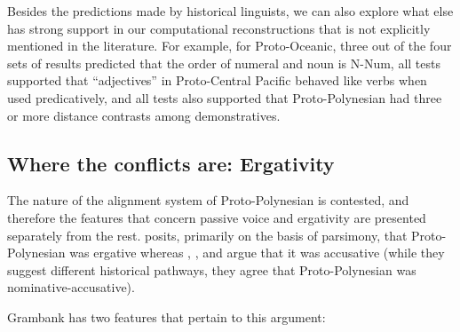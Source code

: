 \documentclass[a4paper,10pt]{article} %
\begin{document}
%
%

Besides the predictions made by historical linguists, we can also explore what else has strong support in our computational reconstructions that is not explicitly mentioned in the literature. For example, for Proto-Oceanic, three out of the four sets of results predicted that the order of numeral and noun is N-Num, all tests supported that ``adjectives'' in Proto-Central Pacific behaved like verbs when used predicatively, and all tests also supported that Proto-Polynesian had three or more distance contrasts among demonstratives. 

\subsection{Where the conflicts are: Ergativity}
The nature of the alignment system of Proto-Polynesian is contested, and therefore the features that concern passive voice and ergativity are presented separately from the rest. \citet{clark1976aspects} posits, primarily on the basis of parsimony, that Proto-Polynesian was ergative whereas \citet{hale_1968}, \citet{hohepa_1967,hohepa_1969}, and \citet{chung1978} argue that it was accusative (while they suggest different historical pathways, they agree that Proto-Polynesian was nominative-accusative).

Grambank has two features that pertain to this argument:
\end{document}
